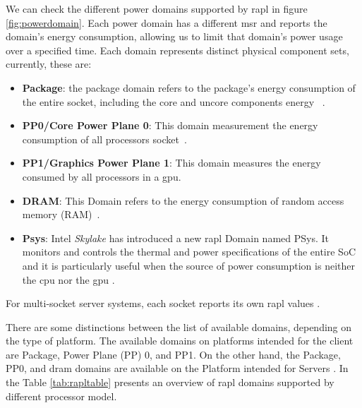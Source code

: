     We can check the different power domains supported by \gls{rapl} in figure \ref{fig:powerdomain}. Each power domain has a different  \gls{msr}  and reports the domain's energy consumption, allowing us to limit that domain's power usage over a specified time. Each domain represents distinct physical component sets, currently, these are: 
    
    \begin{itemize}
        \item \textbf{Package}: the package domain refers to the package's energy consumption of the entire socket, including the core and uncore components energy ~\cite{intel64and}.
        \item \textbf{PP0/Core Power Plane 0}: This domain measurement the energy consumption of all processors socket~\cite{intel64and,portela2016}.
            \item \textbf{PP1/Graphics Power Plane 1}: This domain measures the energy consumed by all processors in a \gls{gpu}.
        \item \textbf{DRAM}: This Domain refers to the energy consumption of random access memory (RAM)~\cite{intel64and,portela2016}.
        \item \textbf{Psys}: Intel \textit{Skylake} has introduced a new \gls{rapl} Domain named PSys. It monitors and controls the thermal and power specifications of the entire SoC and it is particularly useful when the source of power consumption is neither the \gls{cpu} nor the \gls{gpu} \cite{raplpref}.
    \end{itemize}
    For multi-socket server systems, each socket reports its own \gls{rapl} values \cite{raplpref}.
    
    There are some distinctions between the list of available domains, depending on the type of platform. The available domains on platforms intended for the client are Package, Power Plane (PP) 0, and PP1. On the other hand, the Package, PP0, and \gls{dram} domains are available on the Platform intended for Servers \cite{raplpref2}.
    In the Table \ref{tab:rapltable} presents an overview of \gls{rapl} domains supported by different processor model.


